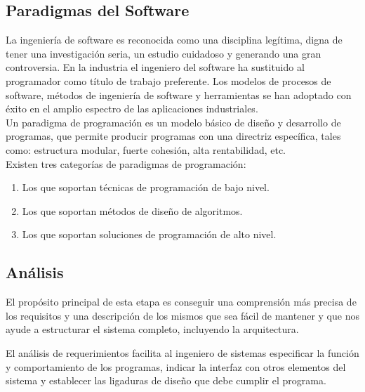 \documentclass[12pt]{article}
\begin{document}
	\subsection*{Paradigmas del Software}

	\hspace{1.27cm}La ingeniería de software es reconocida como una disciplina legítima, digna de tener una investigación seria, un estudio cuidadoso y generando una gran controversia. En la industria el
	ingeniero del software ha sustituido al programador como título de trabajo preferente. Los modelos de procesos de software, métodos de ingeniería de software y herramientas se han adoptado con éxito
	en el amplio espectro de las aplicaciones industriales. \\

	\hspace{1.27cm}Un paradigma de programación es un modelo básico de diseño y desarrollo de programas, que	permite producir programas con una directriz específica, tales como: estructura modular, fuerte
	cohesión, alta rentabilidad, etc. \\

	\hspace{1.27cm}Existen tres categorías de paradigmas de programación:

	\begin{enumerate}[left=1.27cm]
		\item Los que soportan técnicas de programación de bajo nivel.
		\item Los que soportan métodos de diseño de algoritmos.
		\item Los que soportan soluciones de programación de alto nivel.
	\end{enumerate}

	\subsection*{Análisis}

	\hspace{1.27cm}El propósito principal de esta etapa es conseguir una comprensión más precisa de los requisitos y una descripción de los mismos que sea fácil de mantener y que nos ayude a estructurar el sistema completo, incluyendo la arquitectura.

	\hspace{1.27cm}El análisis de requerimientos facilita al ingeniero de sistemas especificar la función y comportamiento de los programas, indicar la interfaz con otros elementos del sistema y establecer las ligaduras de diseño que debe cumplir el programa.
\end{document}
